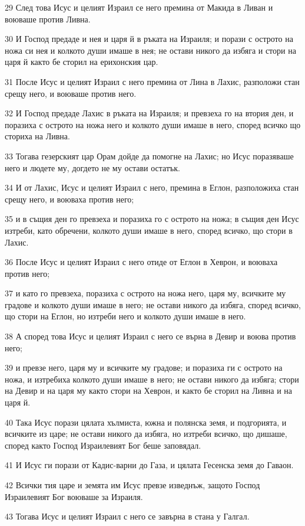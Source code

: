 \par 29 След това Исус и целият Израил се него премина от Макида в Ливан и воюваше против Ливна.
\par 30 И Господ предаде и нея и царя й в ръката на Израиля; и порази с острото на ножа си нея и колкото души имаше в нея; не остави никого да избяга и стори на царя й както бе сторил на ерихонския цар.
\par 31 После Исус и целият Израил с него премина от Лина в Лахис, разположи стан срещу него, и воюваше против него.
\par 32 И Господ предаде Лахис в ръката на Израиля; и превзеха го на втория ден, и поразиха с острото на ножа него и колкото души имаше в него, според всичко що сториха на Ливна.
\par 33 Тогава гезерският цар Орам дойде да помогне на Лахис; но Исус поразяваше него и людете му, догдето не му остави остатък.
\par 34 И от Лахис, Исус и целият Израил с него, премина в Еглон, разположиха стан срещу него, и воюваха против него;
\par 35 и в същия ден го превзеха и поразиха го с острото на ножа; в същия ден Исус изтреби, като обречени, колкото души имаше в него, според всичко, що стори в Лахис.
\par 36 После Исус и целият Израил с него отиде от Еглон в Хеврон, и воюваха против него;
\par 37 и като го превзеха, поразиха с острото на ножа него, царя му, всичките му градове и колкото души имаше в него; не остави никого да избяга, според всичко, що стори на Еглон, но изтреби него и колкото души имаше в него.
\par 38 А според това Исус и целият Израил с него се върна в Девир и воюва против него;
\par 39 и превзе него, царя му и всичките му градове; и поразиха ги с острото на ножа, и изтребиха колкото души имаше в него; не остави никого да избяга; стори на Девир и на царя му както стори на Хеврон, и както бе сторил на Ливна и на царя й.
\par 40 Така Исус порази цялата хълмиста, южна и полянска земя, и подгорията, и всичките из царе; не остави никого да избяга, но изтреби всичко, що дишаше, според както Господ Израилевият Бог беше заповядал.
\par 41 И Исус ги порази от Кадис-варни до Газа, и цялата Гесенска земя до Гаваон.
\par 42 Всички тия царе и земята им Исус превзе изведнъж, защото Господ Израилевият Бог воюваше за Израиля.
\par 43 Тогава Исус и целият Израил с него се завърна в стана у Галгал.

